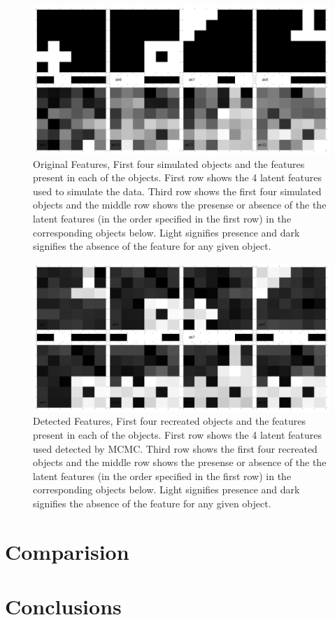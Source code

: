\documentclass{article}
\begin{document}
\begin{figure}
\includegraphics[width=\linewidth]{figures/Original.png}
\caption {Original Features, First four simulated objects and the features present in each of the objects. First row shows the 4 latent features used to simulate the data. Third row shows the first four simulated objects and the middle row shows the presense or absence of the the latent features (in the order specified in the first row) in the corresponding objects below. Light signifies presence and dark signifies the absence of the feature for any given object.}
\label{fig:original}
\end{figure}



\begin{figure}
\includegraphics[width=\linewidth]{figures/Detected.png}
\caption {Detected Features, First four recreated objects and the features present in each of the objects. First row shows the 4 latent features used detected by MCMC. Third row shows the first four recreated objects and the middle row shows the presense or absence of the the latent features (in the order specified in the first row) in the corresponding objects below. Light signifies presence and dark signifies the absence of the feature for any given object.}
\label{fig:detected}
\end{figure}

\section{Comparision}

\section{Conclusions}
\end{document}
